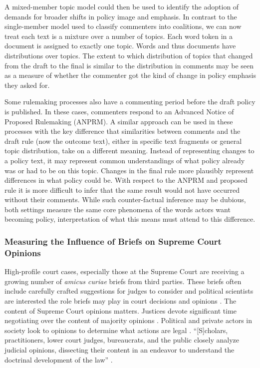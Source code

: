 \documentclass{article}
\begin{document}
A mixed-member topic model could then be used to identify the adoption of demands for broader shifts in policy image and emphasis. In contrast to the single-member model used to classify commenters into coalitions, we can now treat each text is a mixture over a number of topics. Each word token in a document is assigned to exactly one topic. Words and thus documents have distributions over topics. The extent to which distribution of topics that changed from the draft to the final is similar to the distribution in comments may be seen as a measure of whether the commenter got the kind of change in policy emphasis they asked for. 

Some rulemaking processes also have a commenting period before the draft policy is published. In these cases, commenters respond to an Advanced Notice of Proposed Rulemaking (ANPRM). A similar approach can be used in these processes with the key difference that similarities between comments and the draft rule (now the outcome text), either in specific text fragments or general topic distribution, take on a different meaning. Instead of representing changes to a policy text, it may represent common understandings of what policy already was or had to be on this topic. Changes in the final rule more plausibly represent differences in what policy could be. With respect to the ANPRM and proposed rule it is more difficult to infer that the same result would not have occurred without their comments. While such counter-factual inference may be dubious, both settings measure the same core phenomena of the words actors want becoming policy, interpretation of what this means must attend to this difference. 




\subsubsection{Measuring the Influence of Briefs on Supreme Court Opinions}
High-profile court cases, especially those at the Supreme Court are receiving a growing number of \textit{amicus curiae} briefs from third parties. These briefs often include carefully crafted suggestions for judges to consider and political scientists are interested the role briefs may play in court decisions and opinions \citep{Collins2008,Kearney2000,Corley2011}. The content of Supreme Court opinions matters. Justices devote significant time negotiating over the content of majority opinions \citep{Wahlbeck1998}. Political and private actors in society look to opinions to determine what actions are legal \citep{Spriggs2001}. ``[S]cholars, practitioners, lower court judges, bureaucrats, and the public closely analyze judicial opinions, dissecting their content in an endeavor to understand the doctrinal development of the law'' \citep[pg. 31]{Corley2011}.
\end{document}
